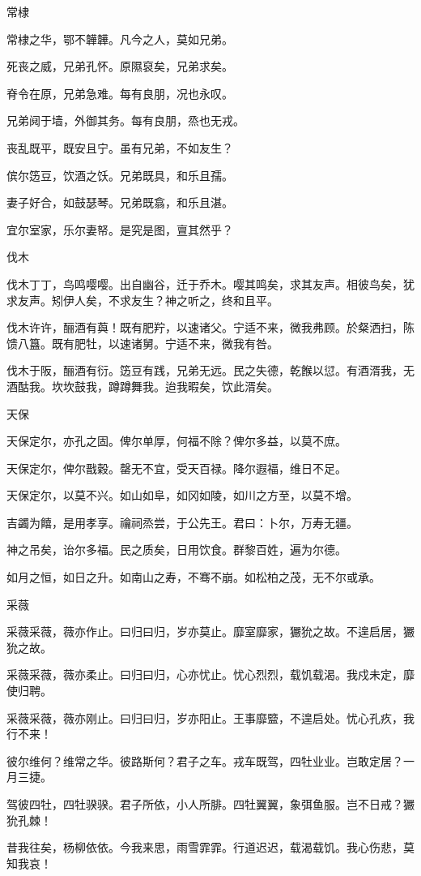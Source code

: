 常棣

常棣之华，鄂不韡韡。凡今之人，莫如兄弟。

死丧之威，兄弟孔怀。原隰裒矣，兄弟求矣。

脊令在原，兄弟急难。每有良朋，况也永叹。

兄弟阋于墙，外御其务。每有良朋，烝也无戎。

丧乱既平，既安且宁。虽有兄弟，不如友生？

傧尔笾豆，饮酒之饫。兄弟既具，和乐且孺。

妻子好合，如鼓瑟琴。兄弟既翕，和乐且湛。

宜尔室家，乐尔妻帑。是究是图，亶其然乎？

伐木

伐木丁丁，鸟鸣嘤嘤。出自幽谷，迁于乔木。嘤其鸣矣，求其友声。相彼鸟矣，犹求友声。矧伊人矣，不求友生？神之听之，终和且平。

伐木许许，酾酒有藇！既有肥羜，以速诸父。宁适不来，微我弗顾。於粲洒扫，陈馈八簋。既有肥牡，以速诸舅。宁适不来，微我有咎。

伐木于阪，酾酒有衍。笾豆有践，兄弟无远。民之失德，乾餱以愆。有酒湑我，无酒酤我。坎坎鼓我，蹲蹲舞我。迨我暇矣，饮此湑矣。

天保

天保定尔，亦孔之固。俾尔单厚，何福不除？俾尔多益，以莫不庶。

天保定尔，俾尔戬穀。罄无不宜，受天百禄。降尔遐福，维日不足。

天保定尔，以莫不兴。如山如阜，如冈如陵，如川之方至，以莫不增。

吉蠲为饎，是用孝享。禴祠烝尝，于公先王。君曰：卜尔，万寿无疆。

神之吊矣，诒尔多福。民之质矣，日用饮食。群黎百姓，遍为尔德。

如月之恒，如日之升。如南山之寿，不骞不崩。如松柏之茂，无不尔或承。

采薇

采薇采薇，薇亦作止。曰归曰归，岁亦莫止。靡室靡家，玁狁之故。不遑启居，玁狁之故。

采薇采薇，薇亦柔止。曰归曰归，心亦忧止。忧心烈烈，载饥载渴。我戍未定，靡使归聘。

采薇采薇，薇亦刚止。曰归曰归，岁亦阳止。王事靡盬，不遑启处。忧心孔疚，我行不来！

彼尔维何？维常之华。彼路斯何？君子之车。戎车既驾，四牡业业。岂敢定居？一月三捷。

驾彼四牡，四牡骙骙。君子所依，小人所腓。四牡翼翼，象弭鱼服。岂不日戒？玁狁孔棘！

昔我往矣，杨柳依依。今我来思，雨雪霏霏。行道迟迟，载渴载饥。我心伤悲，莫知我哀！

